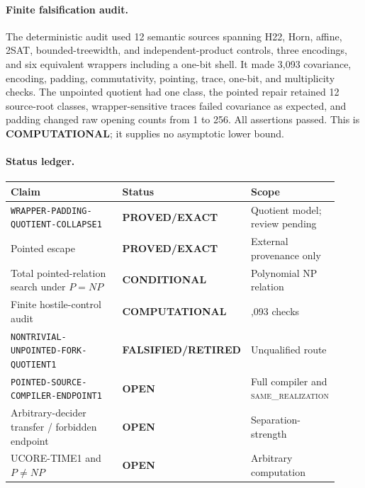 \documentclass[11pt]{article}
\newcommand{\statusproved}{\textcolor{proved}{\textbf{PROVED/EXACT}}}
\newcommand{\statusopen}{\textcolor{openstatus}{\textbf{OPEN}}}
\newcommand{\statusretired}{\textcolor{retired}{\textbf{FALSIFIED/RETIRED}}}
\newcommand{\same}{\textnormal{\textsc{same\_realization}}}
\begin{document}
\paragraph{Finite falsification audit.}
The deterministic audit used 12 semantic sources spanning H22, Horn, affine,
2SAT, bounded-treewidth, and independent-product controls, three encodings,
and six equivalent wrappers including a one-bit shell. It made 3,093
covariance, encoding, padding, commutativity, pointing, trace, one-bit, and
multiplicity checks. The unpointed quotient had one class, the pointed repair
retained 12 source-root classes, wrapper-sensitive traces failed covariance as
expected, and padding changed raw opening counts from 1 to 256. All assertions
passed. This is \textbf{COMPUTATIONAL}; it supplies no asymptotic lower bound.

\paragraph{Status ledger.}
\begin{center}\scriptsize
\begin{tabular}{>{\raggedright\arraybackslash}p{0.43\linewidth}>{\raggedright\arraybackslash}p{0.22\linewidth}>{\raggedright\arraybackslash}p{0.27\linewidth}}
\toprule
Claim & Status & Scope\\ \midrule
\texttt{WRAPPER-PADDING-QUOTIENT-COLLAPSE1} & \statusproved & Quotient model; review pending\\
Pointed escape & \statusproved & External provenance only\\
Total pointed-relation search under $P=NP$ & \textbf{CONDITIONAL} & Polynomial NP relation\\
Finite hostile-control audit & \textbf{COMPUTATIONAL} & 3,093 checks\\
\texttt{NONTRIVIAL-UNPOINTED-FORK-QUOTIENT1} & \statusretired & Unqualified route\\
\texttt{POINTED-SOURCE-COMPILER-ENDPOINT1} & \statusopen & Full compiler and \same\\
Arbitrary-decider transfer / forbidden endpoint & \statusopen & Separation-strength\\
UCORE-TIME1 and $P\ne NP$ & \statusopen & Arbitrary computation\\
\bottomrule
\end{tabular}
\end{center}
\end{document}

